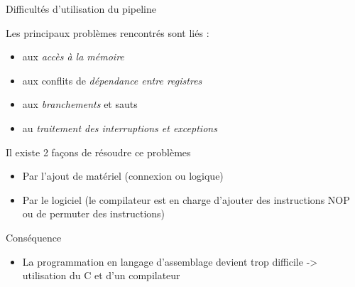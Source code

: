 %
\begin{Frame}{Difficultés d'utilisation du pipeline}

\begin{block}{Les principaux problèmes rencontrés sont liés :}
       \begin{center}
 	\begin{itemize}
         \item aux \emph{accès à la mémoire}
	 \item aux conflits de \emph{dépendance entre registres}
	 \item aux \emph{branchements} et sauts
	 \item au \emph{traitement des interruptions et exceptions}
        \end{itemize}
       \end{center}
      \end{block}   

\begin{block}{Il existe 2 façons de résoudre ce problèmes}
       \begin{center}
 	\begin{itemize}
         \item Par l'ajout de matériel (connexion ou logique)
	 \item Par le logiciel (le compilateur est en charge d'ajouter des instructions NOP ou de permuter des instructions)
        \end{itemize}
       \end{center}
      \end{block}   

\begin{block}{Conséquence}
       \begin{center}
 	\begin{itemize}
         \item La programmation en langage d'assemblage devient trop difficile -> utilisation du C et d'un compilateur
        \end{itemize}
       \end{center}
      \end{block}   

\end{Frame}


